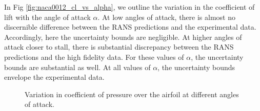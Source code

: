 In Fig \ref{fig:naca0012_cl_vs_alpha}, we outline the variation in the coefficient of lift with the angle of attack $\alpha$. At low angles of attack, there is almost no discernible difference between the RANS predictions and the experimental data. Accordingly, here the uncertainty bounds are negligible. At higher angles of attack closer to stall, there is substantial discrepancy between the RANS predictions and the high fidelity data. For these values of $\alpha$, the uncertainty bounds are substantial as well. At all values of $\alpha$, the uncertainty bounds envelope the experimental data. 

\begin{figure}
\center
{}
\caption{Variation in coefficient of pressure over the airfoil at different angles of attack.}
\end{figure}

